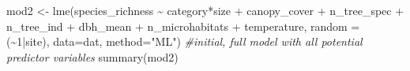 \documentclass[
]{article}
\newenvironment{Shaded}{\begin{snugshade}}{\end{snugshade}}
\newcommand{\AttributeTok}[1]{\textcolor[rgb]{0.77,0.63,0.00}{#1}}
\newcommand{\CommentTok}[1]{\textcolor[rgb]{0.56,0.35,0.01}{\textit{#1}}}
\newcommand{\DecValTok}[1]{\textcolor[rgb]{0.00,0.00,0.81}{#1}}
\newcommand{\FunctionTok}[1]{\textcolor[rgb]{0.00,0.00,0.00}{#1}}
\newcommand{\NormalTok}[1]{#1}
\newcommand{\OtherTok}[1]{\textcolor[rgb]{0.56,0.35,0.01}{#1}}
\newcommand{\SpecialCharTok}[1]{\textcolor[rgb]{0.00,0.00,0.00}{#1}}
\newcommand{\StringTok}[1]{\textcolor[rgb]{0.31,0.60,0.02}{#1}}
\begin{document}
\begin{Shaded}
\begin{Highlighting}[]
\NormalTok{mod2 }\OtherTok{\textless{}{-}} \FunctionTok{lme}\NormalTok{(species\_richness }\SpecialCharTok{\textasciitilde{}}\NormalTok{ category}\SpecialCharTok{*}\NormalTok{size }\SpecialCharTok{+}\NormalTok{ canopy\_cover }\SpecialCharTok{+}\NormalTok{ n\_tree\_spec }\SpecialCharTok{+}\NormalTok{ n\_tree\_ind }\SpecialCharTok{+}\NormalTok{ dbh\_mean }\SpecialCharTok{+}\NormalTok{ n\_microhabitats }\SpecialCharTok{+}\NormalTok{ temperature, }\AttributeTok{random =}\NormalTok{ (}\SpecialCharTok{\textasciitilde{}}\DecValTok{1}\SpecialCharTok{|}\NormalTok{site), }\AttributeTok{data=}\NormalTok{dat, }\AttributeTok{method=}\StringTok{"ML"}\NormalTok{) }\CommentTok{\#initial, full model with all potential predictor variables}
\FunctionTok{summary}\NormalTok{(mod2)}
\end{Highlighting}
\end{Shaded}
\end{document}
